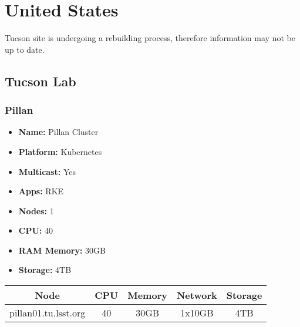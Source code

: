 \newpage
\section{United States}
\vspace*{-\baselineskip}
Tucson site is undergoing a rebuilding process, therefore information may not be up to date.
\subsection{Tucson Lab}
\subsubsection{Pillan}
\vspace*{-\baselineskip}
\begin{itemize}
  \itemsep0em 
  \item \textbf{Name:}       Pillan Cluster
  \item \textbf{Platform:}   Kubernetes
  \item \textbf{Multicast:}  Yes
  \item \textbf{Apps:}       RKE
  \item \textbf{Nodes:}      1
  \item \textbf{CPU:}        40
  \item \textbf{RAM Memory:} 30GB
  \item \textbf{Storage:} 4TB
\end{itemize}
\vspace*{-\baselineskip}
\begin{center}
  \small
  \begin{tabular}{||c c c c c||}
    \hline
    \textbf{Node} & \textbf{CPU} & \textbf{Memory} & \textbf{Network} & \textbf{Storage} \\ [0.5ex]
    \hline
    pillan01.tu.lsst.org & 40 & 30GB & 1x10GB & 4TB \\
    \hline
  \end{tabular}
\end{center}
\vspace*{-\baselineskip}
